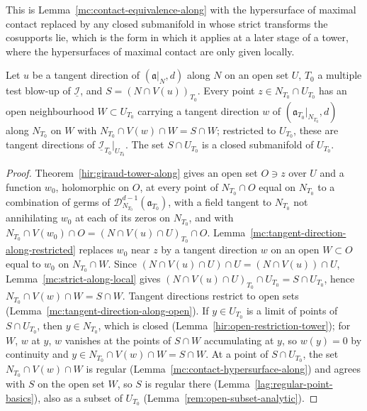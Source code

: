 This is Lemma~\ref{mc:contact-equivalence-along} with the hypersurface of maximal contact replaced by any closed submanifold in whose strict transforms the
cosupports lie, which is the form in which it applies at a later stage of a tower, where the hypersurfaces of maximal contact are only given locally.

\begin{lemma}
\label{mc:tangent-direction-stage}
\leanok
Let \(u\) be a tangent direction of \((\mathfrak a|_N,d)\) along \(N\) on an open set \(U\), \(T_0\) a multiple test blow-up of \(\underline{\mathcal I}\), and
\(S=(N\cap V(u))_{T_0}\). Every point \(z\in N_{T_0}\cap U_{T_0}\) has an open neighbourhood \(W\subset U_{T_0}\) carrying a tangent direction \(w\) of
\((\mathfrak a_{T_0}|_{N_{T_0}},d)\) along \(N_{T_0}\) on \(W\) with \(N_{T_0}\cap V(w)\cap W=S\cap W\); restricted to \(U_{T_0}\), these are tangent directions of
\(\underline{\mathcal I}_{T_0}|_{U_{T_0}}\). The set \(S\cap U_{T_0}\) is a closed submanifold of \(U_{T_0}\).
\end{lemma}
\begin{proof}
\leanok
Theorem~\ref{hir:giraud-tower-along} gives an open set \(O\ni z\) over \(U\) and a function \(w_0\), holomorphic on \(O\), at every point of \(N_{T_0}\cap O\) equal on \(N_{T_0}\) to a
combination of germs of \(\mathcal D_{N_{T_0}}^{d-1}(\mathfrak a_{T_0})\), with a field tangent to \(N_{T_0}\) not annihilating \(w_0\) at each of its zeros on \(N_{T_0}\), and with
\(N_{T_0}\cap V(w_0)\cap O=(N\cap V(u)\cap U)_{T_0}\cap O\). Lemma~\ref{mc:tangent-direction-along-restricted} replaces \(w_0\) near \(z\) by a tangent direction \(w\) on an open
\(W\subset O\) equal to \(w_0\) on \(N_{T_0}\cap W\). Since \((N\cap V(u)\cap U)\cap U=(N\cap V(u))\cap U\), Lemma~\ref{mc:strict-along-local} gives
\((N\cap V(u)\cap U)_{T_0}\cap U_{T_0}=S\cap U_{T_0}\), hence \(N_{T_0}\cap V(w)\cap W=S\cap W\). Tangent directions restrict to open sets
(Lemma~\ref{mc:tangent-direction-along-open}). If \(y\in U_{T_0}\) is a limit of points of \(S\cap U_{T_0}\), then \(y\in N_{T_0}\), which is closed
(Lemma~\ref{hir:open-restriction-tower}); for \(W\), \(w\) at \(y\), \(w\) vanishes at the points of \(S\cap W\) accumulating at \(y\), so \(w(y)=0\) by continuity and
\(y\in N_{T_0}\cap V(w)\cap W=S\cap W\). At a point of \(S\cap U_{T_0}\), the set \(N_{T_0}\cap V(w)\cap W\) is regular (Lemma~\ref{mc:contact-hypersurface-along}) and agrees with
\(S\) on the open set \(W\), so \(S\) is regular there (Lemma~\ref{lag:regular-point-basics}), also as a subset of \(U_{T_0}\) (Lemma~\ref{rem:open-subset-analytic}).
\end{proof}

